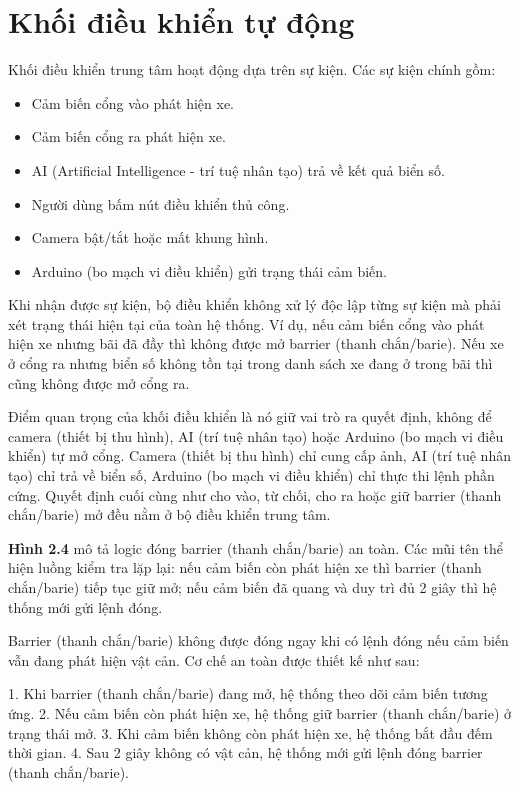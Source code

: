 \documentclass[a4paper,14pt]{extreport}
\begin{document}
\section{Khối điều khiển tự động}

Khối điều khiển trung tâm hoạt động dựa trên sự kiện. Các sự kiện chính gồm:

\begin{itemize}[leftmargin=2em]
  \item Cảm biến cổng vào phát hiện xe.
  \item Cảm biến cổng ra phát hiện xe.
  \item AI (Artificial Intelligence - trí tuệ nhân tạo) trả về kết quả biển số.
  \item Người dùng bấm nút điều khiển thủ công.
  \item Camera bật/tắt hoặc mất khung hình.
  \item Arduino (bo mạch vi điều khiển) gửi trạng thái cảm biến.
\end{itemize}
Khi nhận được sự kiện, bộ điều khiển không xử lý độc lập từng sự kiện mà phải xét trạng thái hiện tại của toàn hệ thống. Ví dụ, nếu cảm biến cổng vào phát hiện xe nhưng bãi đã đầy thì không được mở barrier (thanh chắn/barie). Nếu xe ở cổng ra nhưng biển số không tồn tại trong danh sách xe đang ở trong bãi thì cũng không được mở cổng ra.

Điểm quan trọng của khối điều khiển là nó giữ vai trò ra quyết định, không để camera (thiết bị thu hình), AI (trí tuệ nhân tạo) hoặc Arduino (bo mạch vi điều khiển) tự mở cổng. Camera (thiết bị thu hình) chỉ cung cấp ảnh, AI (trí tuệ nhân tạo) chỉ trả về biển số, Arduino (bo mạch vi điều khiển) chỉ thực thi lệnh phần cứng. Quyết định cuối cùng như cho vào, từ chối, cho ra hoặc giữ barrier (thanh chắn/barie) mở đều nằm ở bộ điều khiển trung tâm.


\textbf{Hình 2.4} mô tả logic đóng barrier (thanh chắn/barie) an toàn. Các mũi tên thể hiện luồng kiểm tra lặp lại: nếu cảm biến còn phát hiện xe thì barrier (thanh chắn/barie) tiếp tục giữ mở; nếu cảm biến đã quang và duy trì đủ 2 giây thì hệ thống mới gửi lệnh đóng.

Barrier (thanh chắn/barie) không được đóng ngay khi có lệnh đóng nếu cảm biến vẫn đang phát hiện vật cản. Cơ chế an toàn được thiết kế như sau:

1. Khi barrier (thanh chắn/barie) đang mở, hệ thống theo dõi cảm biến tương ứng.
2. Nếu cảm biến còn phát hiện xe, hệ thống giữ barrier (thanh chắn/barie) ở trạng thái mở.
3. Khi cảm biến không còn phát hiện xe, hệ thống bắt đầu đếm thời gian.
4. Sau 2 giây không có vật cản, hệ thống mới gửi lệnh đóng barrier (thanh chắn/barie).
\end{document}

